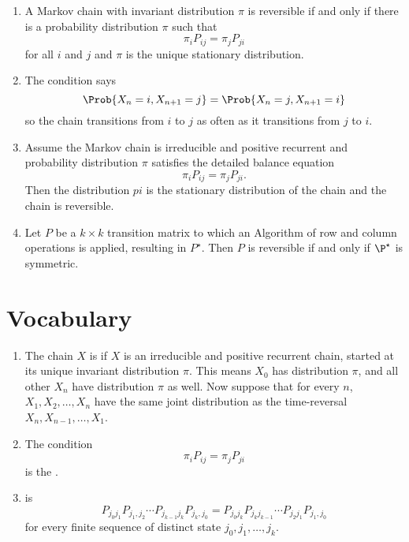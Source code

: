 \documentclass[12pt]{article}
\begin{document}
\begin{enumerate}
    \item
        A Markov chain with invariant distribution \( \pi \) is
        reversible if and only if there is a probability distribution \(
        \pi \) such that
        \[
            \pi_i P_{ij} = \pi_j P_{ji}
        \] for all \( i \) and \( j \) and \( \pi \) is the unique
        stationary distribution.
    \item
        The condition says
        \[
            \Prob{X_n =i, X_{n+1} = j} = \Prob{X_n =j, X_{n+1} = i}
        \] so the chain transitions from \( i \) to \( j \) as often as
        it transitions from \( j \) to \( i \).
    \item
        Assume the Markov chain is irreducible and positive recurrent
        and probability distribution \( \pi \) satisfies the detailed
        balance equation
        \[
            \pi_i P_{ij} = \pi_j P_{ji}.
        \] Then the distribution \( pi \) is the stationary distribution
        of the chain and the chain is reversible.
    \item
        Let \( P \) be a \( k \times k \) transition matrix to which an
        Algorithm of row and column operations is applied, resulting in \(
        P^{\star} \).  Then \( P \) is reversible if and only if \( \P^{\star}
        \) is symmetric.
\end{enumerate}

\hr

\section*{Vocabulary}
\begin{enumerate}
    \item
        The chain \( X \) is  if \( X \) is an
        irreducible and positive recurrent chain, started at its unique
        invariant distribution \( \pi \).  This means \( X_0 \) has
        distribution \( \pi \), and all other \( X_n \) have
        distribution \( \pi \) as well. Now suppose that for every \( n \),
        \( X_1, X_2, \dots , X_n \) have the same joint distribution as
        the time-reversal \( X_n, X_{n-1}, \dots , X_1 \).
    \item
        The condition
        \[
            \pi_i P_{ij} = \pi_j P_{ji}
        \] is the .
    \item
         is
        \[
            P_{j_0 j_1} P_{j_1,j_2} \cdots P_{j_{k-1} j_k} P_{j_k, j_0}
            = P_{j_0 j_k} P_{j_k j_{k-1}} \cdots P_{j_2 j_1} P_{j_1, j_0}
        \] for every finite sequence of distinct state \( j_0, j_1,
        \dots, j_k \).
\end{enumerate}
\end{document}
